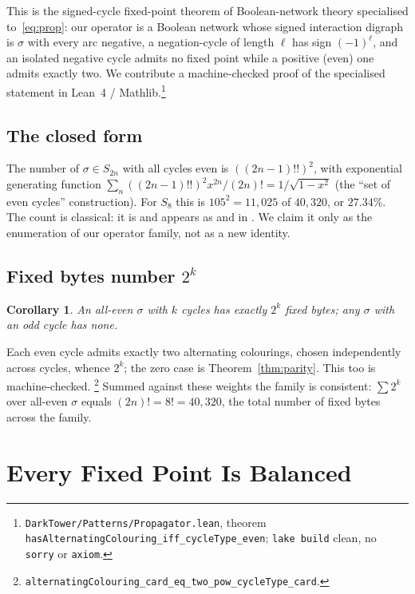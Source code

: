 \documentclass[man,12pt,floatsintext]{apa7}
\newcommand{\sig}{\sigma}
\newtheorem{corollary}{Corollary}
\begin{document}
This is the signed-cycle fixed-point theorem of Boolean-network theory
\parencite{aracena2008maximum} specialised to~\eqref{eq:prop}: our operator
is a Boolean network whose signed interaction digraph is $\sig$ with every
arc negative, a negation-cycle of length $\ell$ has sign $(-1)^\ell$, and
an isolated negative cycle admits no fixed point while a positive (even)
one admits exactly two. We contribute a machine-checked proof of the
specialised statement in Lean~4 / Mathlib.\footnote{%
\texttt{DarkTower/Patterns/Propagator.lean}, theorem
\texttt{hasAlternatingColouring\_iff\_cycleType\_even}; \texttt{lake build}
clean, no \texttt{sorry} or \texttt{axiom}.}

\subsection{The closed form}

The number of $\sig \in S_{2n}$ with all cycles even is $((2n-1)!!)^2$, with
exponential generating function $\sum_n ((2n-1)!!)^2 x^{2n}/(2n)! =
1/\sqrt{1-x^2}$ (the ``set of even cycles'' construction).
For $S_8$ this is $105^2 = 11{,}025$ of $40{,}320$, or $27.34\%$. The count
is classical: it is \textcite{oeis_a001818} and appears as
\textcite[Problem~5.34(c)]{stanley1999enumerative} and in
\textcite{riordan1968combinatorial}. We claim it only as the enumeration of
our operator family, not as a new identity.

\subsection{Fixed bytes number $2^k$}

\begin{corollary}\label{cor:count}
An all-even $\sig$ with $k$ cycles has exactly $2^k$ fixed bytes; any $\sig$ with
an odd cycle has none.
\end{corollary}
Each even cycle admits exactly two alternating colourings, chosen independently
across cycles, whence $2^k$; the zero case is Theorem~\ref{thm:parity}. This too
is machine-checked.%
\footnote{\texttt{alternatingColouring\_card\_eq\_two\_pow\_cycleType\_card}.}
Summed against these weights the family is consistent:
$\sum 2^{k}$ over all-even $\sig$ equals $(2n)! = 8! = 40{,}320$, the total
number of fixed bytes across the family.

\section{Every Fixed Point Is Balanced}
\label{sec:lambda}
\end{document}
